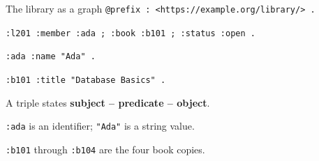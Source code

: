 \begin{frame}[t]{The library as a graph}
\small
\texttt{@prefix : <https://example.org/library/> .}\par\medskip
\texttt{:l201 :member :ada ; :book :b101 ; :status :open .}\par\smallskip
\texttt{:ada :name "Ada" .}\par
\texttt{:b101 :title "Database Basics" .}
\vspace{5mm}\par\normalsize
A triple states \textbf{subject -- predicate -- object}.\par
\smallskip\texttt{:ada} is an identifier; \texttt{"Ada"} is a string value.\par
\smallskip\texttt{:b101} through \texttt{:b104} are the four book copies.
\end{frame}
